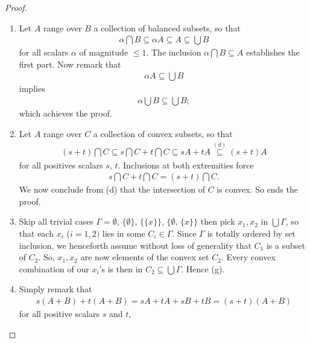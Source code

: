 \begin{proof}
\begin{enumerate}
%
\begin{align}
  0A + A \overset{(b)}{=}\{0\}+A=A.
\end{align}
%
The extension to $s=1$ is analogously established %
(or simply use the fact that $+$ is commutative!).
So ends the proof. %
\item Let $A$ range over $B$ a collection of balanced subsets, so that %
%
\begin{align}
  \alpha \bigcap B \subseteq  \alpha A \subseteq A \subseteq \bigcup B 
\end{align}
%
for all scalars $\alpha$ of magnitude $\leq 1$. %
The inclusion $\alpha \bigcap B \subseteq A$ establishes the first part. %
Now remark that %
%
\begin{align}
  \alpha A  \subseteq \bigcup {B} 
\end{align}
%
implies %
%
\begin{align}
  \alpha \bigcup {B} \subseteq \bigcup {B};
\end{align}
which achieves the proof. %
%
\item Let $A$ range over $C$ a collection of convex subsets, so that %
%
\begin{align}
  (s+t) \bigcap C \subseteq s\bigcap C + t\bigcap C \subseteq  sA + tA 
  \overset{(d)}{\subseteq} (s+t)A
\end{align}
%
for all positives scalars $\mathit{s}$, $\mathit{t}$. %
Inclusions at both extremities force %
%
\begin{align}
  s\bigcap C  + t\bigcap C = (s+t) \bigcap C.
\end{align}
%
We now conclude from (d) that the intersection of $C$ is convex. %
So ends the proof.
\item Skip all trivial cases %
%
  $\Gamma = \emptyset$, %
  $\{ \emptyset\}$, %
  $\{\{x\}\}$, %
  $\{\emptyset$, %
  $\{x\}\}$ %
%
then pick $x_1, x_2$ in $\bigcup \Gamma$, 
so that each $x_i$ ($i=1, 2)$ lies in some $C_i \in \Gamma$. %
%
Since $\Gamma$ is totally ordered by set inclusion, we henceforth assume %
without loss of generality that $C_1$ is a subset of $C_2$. %
%
So, $x_1, x_2$ are now elements of the convex set $C_2$. %
Every convex combination of our $x_i$'s is then in %
$C_2 \subseteq \bigcup \Gamma$. Hence (g). %
%
\item Simply remark that 
%
\begin{align}
  s (A+B) + t (A+B) = s A+ t A +s B +t B = (s+t)(A+B)
\end{align}
%
for all positive scalars $\mathit{s}$ and $\mathit{t}$, %

\end{enumerate}
\end{proof}
